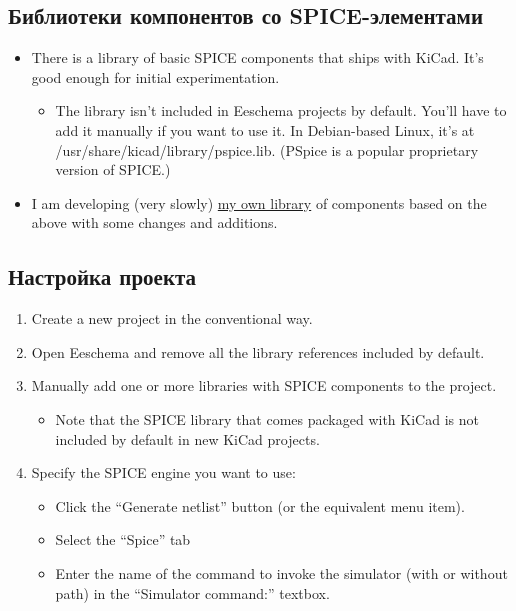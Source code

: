 \subsection{Библиотеки компонентов со SPICE-элементами}

\begin{itemize}

\item There is a library of basic SPICE components that ships with KiCad. It's
good enough for initial experimentation.

\begin{itemize}
\item The library isn't included in Eeschema projects by default. You'll have to
add it manually if you want to use it.
In Debian-based Linux, it's at \\/usr/share/kicad/library/pspice.lib. (PSpice is
a popular proprietary version of SPICE.)
\end{itemize}

\item I am developing (very slowly)
\href{https://bitbucket.org/mithat/kicad-spice-library}{my own
library}
of components based on the above with some changes and additions.

\end{itemize}

\subsection{Настройка проекта}

\begin{enumerate}
\item Create a new project in the conventional way.
\item Open Eeschema and remove all the library references included by default.
\item Manually add one or more libraries with SPICE components to the project.
\begin{itemize}
  \item Note that the SPICE library that comes packaged with KiCad is not
  included by default in new KiCad projects.
\end{itemize}
\item Specify the SPICE engine you want to use:
\begin{itemize}
  \item Click the “Generate netlist” button (or the equivalent menu item).
  \item Select the “Spice” tab
  \item Enter the name of the command to invoke the simulator (with or without
path) in the “Simulator command:” textbox.
\end{itemize}
\end{enumerate}

